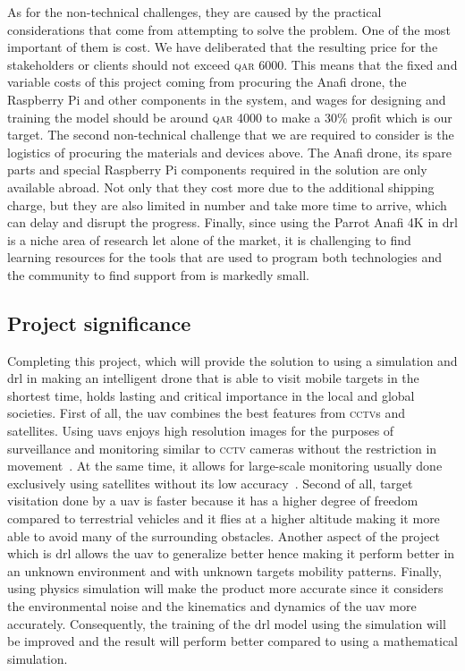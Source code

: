 \documentclass[../main.tex]{subfiles}
\begin{document}
As for the non-technical challenges, they are caused
by the practical considerations that come
from attempting to solve the problem.
One of the most important of them is cost. 
We have deliberated that
the resulting price for the stakeholders or clients
should not exceed \textsc{qar} 6000. 
This means that the fixed and variable costs of this project
coming from procuring the Anafi drone, the Raspberry Pi and other
components in the system, 
and wages for designing and training the model
should be around \textsc{qar} 4000 to make a 30\% profit 
which is our target.
The second non-technical challenge that we are required to consider
is the logistics of procuring the materials and devices above.
The Anafi drone, its spare parts and special Raspberry Pi
components required in the solution are only available abroad.
Not only that they cost more due to the additional shipping charge,
but they are also limited in number 
and take more time to arrive, which can delay 
and disrupt the progress.
Finally, since using the Parrot Anafi 4K in \gls{drl}
is a niche area of research let alone of the market,
it is challenging to find learning resources for the tools
that are used to program both technologies
and the community to find support from is markedly small.

\subsection{Project significance}

Completing this project, which will provide the solution
to using a simulation and \gls{drl} in making an intelligent drone 
that is able to visit mobile targets in the shortest time,
holds lasting and critical importance 
in the local and global societies.
First of all, the \gls{uav} combines the best features
from \textsc{cctv}s and satellites.
Using \glspl{uav} enjoys high resolution images
for the purposes of surveillance and monitoring
similar to \textsc{cctv} cameras 
without the restriction in movement~\cite{Sha19}.
At the same time, it allows for large-scale monitoring 
usually done exclusively using satellites 
without its low accuracy~\cite{Sha19}.
Second of all, target visitation done by a \gls{uav}
is faster because it has a higher degree of freedom
compared to terrestrial vehicles and
it flies at a higher altitude 
making it more able to avoid 
many of the surrounding obstacles.
Another aspect of the project which is \gls{drl} 
allows the \gls{uav} to generalize better
hence making it perform better in an unknown environment
and with unknown targets mobility patterns.
Finally, using physics simulation will make the product 
more accurate since it considers 
the environmental noise and
the kinematics and dynamics of the \gls{uav} more accurately.
Consequently, the training of the \gls{drl} model 
using the simulation will be improved 
and the result will perform better
compared to using a mathematical simulation.
\end{document}
